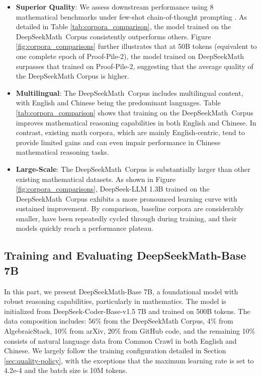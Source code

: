 \begin{itemize}[topsep=0pt]
    \item \textbf{Superior Quality}:
    We assess downstream performance using 8 mathematical benchmarks under few-shot chain-of-thought prompting \cite{cot}. As detailed in Table \ref{tab:corpora_comparison}, the model trained on the DeepSeekMath~Corpus consistently outperforms others. Figure \ref{fig:corpora_comparisons} further illustrates that at 50B tokens (equivalent to one complete epoch of Proof-Pile-2), the model trained on DeepSeekMath surpasses that trained on Proof-Pile-2, suggesting that the average quality of the DeepSeekMath Corpus is higher.
    \item \textbf{Multilingual}:
    The DeepSeekMath~Corpus includes multilingual content, with English and Chinese being the predominant languages. Table \ref{tab:corpora_comparison} shows that training on the DeepSeekMath~Corpus improves mathematical reasoning capabilities in both English and Chinese. In contrast, existing math corpora, which are mainly English-centric, tend to provide limited gains and can even impair performance in Chinese mathematical reasoning tasks.
    \item \textbf{Large-Scale}:
    The DeepSeekMath~Corpus is substantially larger than other existing mathematical datasets. As shown in Figure \ref{fig:corpora_comparisons}, DeepSeek-LLM 1.3B trained on the DeepSeekMath~Corpus exhibits a more pronounced learning curve with sustained improvement. By comparison, baseline corpora are considerably smaller, have been repeatedly cycled through during training, and their models quickly reach a performance plateau.
\end{itemize}

\subsection{Training and Evaluating DeepSeekMath-Base 7B}

In this part, we present DeepSeekMath-Base 7B, a foundational model with robust reasoning capabilities, particularly in mathematics. The model is initialized from DeepSeek-Coder-Base-v1.5 7B \citep{deepseek-coder} and trained on 500B tokens. The data composition includes: 56\% from the DeepSeekMath Corpus, 4\% from AlgebraicStack, 10\% from arXiv, 20\% from GitHub code, and the remaining 10\% consists of natural language data from Common Crawl in both English and Chinese. We largely follow the training configuration detailed in Section \ref{sec:quality-policy}, with the exceptions that the maximum learning rate is set to 4.2e-4 and the batch size is 10M tokens.

